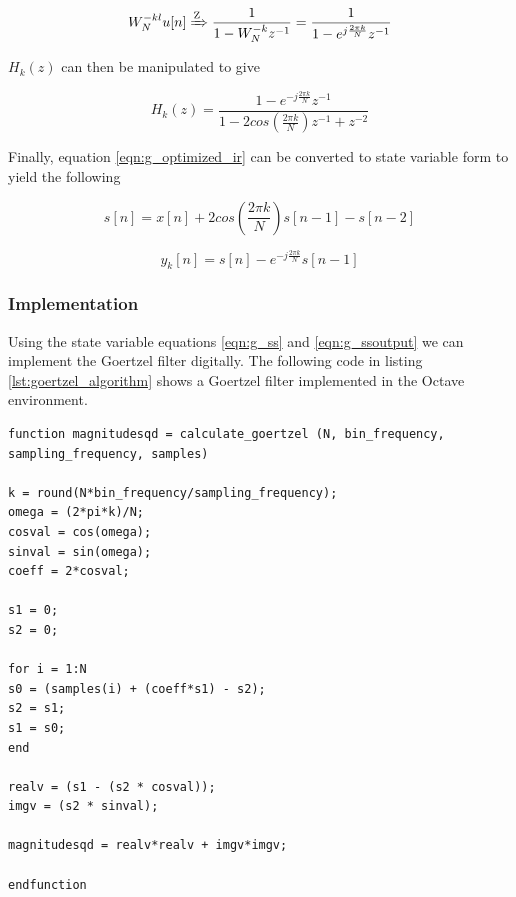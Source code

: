 \begin{equation}
W_N^{-kl}u[n] \xRightarrow{\text{Z}} \frac{1}{1 - W_N^{-k}z^{-1}} = \frac{1}{1 - e^{j\frac{2\pi k}{N}}z^{-1}}
\end{equation}

$H_k(z)$ can then be manipulated to give

\begin{equation}
\label{eqn:g_optimized_ir}
H_k(z) = \frac{1 - e^{-j\frac{2\pi k}{N}}z^{-1}}{1 - 2cos(\frac{2\pi k}{N})z^{-1} + z^{-2}}
\end{equation}

Finally, equation \ref{eqn:g_optimized_ir} can be converted to state variable form to yield the following


\begin{equation}
\label{eqn:g_ss}
s[n] = x[n]+2cos(\frac{2\pi k}{N})s[n-1]-s[n-2]
\end{equation}


\begin{equation}
\label{eqn:g_ssoutput}
y_k[n] = s[n]-e^{-j\frac{2\pi k}{N}}s[n-1]
\end{equation}



\subsubsection{Implementation}
\label{sec:goertzel_implementation}
Using the state variable equations \ref{eqn:g_ss} and \ref{eqn:g_ssoutput} we can implement the Goertzel filter digitally. The following code in listing \ref{lst:goertzel_algorithm} shows a Goertzel filter implemented in the Octave environment.

\begin{lstlisting}[caption={Goertzel Algorithm - Octave Implementation\label{lst:goertzel_algorithm}}]
function magnitudesqd = calculate_goertzel (N, bin_frequency, sampling_frequency, samples)

k = round(N*bin_frequency/sampling_frequency);
omega = (2*pi*k)/N;
cosval = cos(omega);
sinval = sin(omega);
coeff = 2*cosval;

s1 = 0;
s2 = 0;

for i = 1:N
s0 = (samples(i) + (coeff*s1) - s2);
s2 = s1;
s1 = s0;    
end

realv = (s1 - (s2 * cosval));
imgv = (s2 * sinval);  

magnitudesqd = realv*realv + imgv*imgv;

endfunction
\end{lstlisting}


